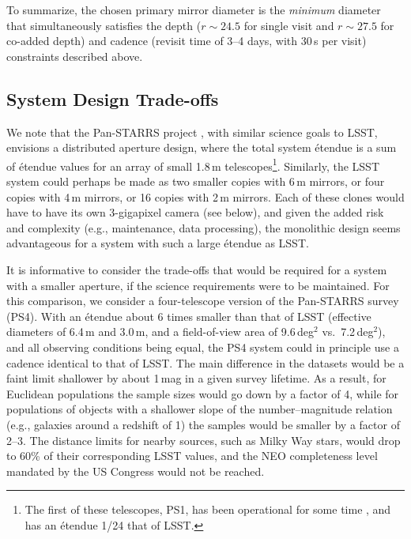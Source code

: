 To summarize, the chosen primary mirror diameter is the \textit{minimum}
diameter that simultaneously satisfies the depth ($r\sim24.5$ for single visit and
$r\sim27.5$ for co-added depth) and cadence (revisit time of 3--4 days,
with 30\,s per visit) constraints described above.

\subsection{System Design Trade-offs}

We note that the Pan-STARRS project \citep{2002SPIE.4836..154K,2010SPIE.7733E..0EK}, with similar science
goals to LSST, envisions a distributed aperture design, where the total
system \'etendue is
a sum of \'etendue values for an array of small 1.8\,m telescopes\footnote{The
first of these telescopes, PS1, has been operational for some time \citep{2016arXiv161205560C}, and
has an \'etendue 1/24 that of LSST. }.
Similarly, the LSST system could perhaps be made as two smaller copies with
6\,m mirrors, or four copies with 4\,m mirrors, or 16 copies with 2\,m mirrors. Each
of these clones would have to have its own 3-gigapixel camera (see below), and
given the added risk and complexity (e.g., maintenance, data processing), the monolithic
design seems advantageous for a system with such a large \'etendue as LSST.

It is informative to consider the trade-offs that would be required
for a system with a smaller aperture, if the science requirements were
to be maintained. For this comparison, we consider a four-telescope version of
the Pan-STARRS survey (PS4). With an \'etendue about 6 times smaller
than that of LSST (effective diameters of 6.4\,m and 3.0\,m, and a field-of-view area
of 9.6\,deg$^2$ vs.\ 7.2\,deg$^2$), and all observing conditions being equal,
the PS4 system could in principle use a cadence identical to that of LSST. The
main difference in the datasets would be a faint limit shallower by about
1\,mag in a given survey lifetime. As a result, for Euclidean populations the
sample sizes would go down by a factor of 4, while for populations of
objects with a shallower slope of the number--magnitude relation (e.g.,
galaxies around a redshift of 1) the samples would be smaller by a factor of 2--3.
The distance limits for nearby sources, such as Milky Way stars, would drop to
60\% of their corresponding LSST values, and the NEO completeness level mandated by
the US Congress would not be reached.

